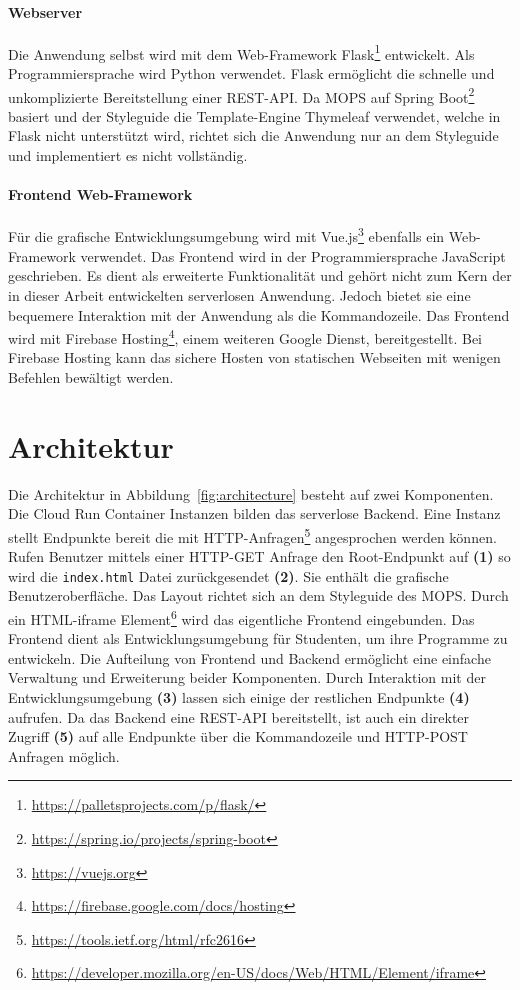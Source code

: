 \paragraph{Webserver} Die Anwendung selbst wird mit dem Web-Framework
Flask\footnote{\url{https://palletsprojects.com/p/flask/}}
entwickelt. Als Programmiersprache wird Python verwendet.
Flask ermöglicht die schnelle und unkomplizierte Bereitstellung einer REST-API.
Da MOPS auf Spring Boot\footnote{\url{https://spring.io/projects/spring-boot}} basiert und
der Styleguide die Template-Engine Thymeleaf verwendet, welche in Flask nicht unterstützt wird,
richtet sich die Anwendung nur an dem Styleguide und implementiert es nicht vollständig.

\paragraph{Frontend Web-Framework} Für die grafische Entwicklungsumgebung
wird mit Vue.js\footnote{\url{https://vuejs.org}} ebenfalls ein Web-Framework verwendet.
Das Frontend wird in der Programmiersprache JavaScript geschrieben. Es dient als
erweiterte Funktionalität und gehört nicht zum Kern der in dieser Arbeit entwickelten
serverlosen Anwendung. Jedoch bietet sie eine bequemere Interaktion mit der Anwendung als
die Kommandozeile. Das Frontend wird mit
Firebase Hosting\footnote{\url{https://firebase.google.com/docs/hosting}}, einem weiteren Google Dienst,
bereitgestellt. Bei Firebase Hosting kann das sichere Hosten von statischen Webseiten
mit wenigen Befehlen bewältigt werden.

\section{Architektur}
Die Architektur in Abbildung~\ref{fig:architecture} besteht auf zwei
Komponenten.
Die Cloud Run Container Instanzen bilden das serverlose Backend.
Eine Instanz stellt Endpunkte bereit die mit
HTTP-Anfragen\footnote{\url{https://tools.ietf.org/html/rfc2616}}
angesprochen werden können. Rufen Benutzer
mittels einer HTTP-GET Anfrage den
Root-Endpunkt auf \textbf{(1)} so wird
die \texttt{index.html} Datei zurückgesendet \textbf{(2)}.
Sie enthält die grafische Benutzeroberfläche. Das Layout richtet
sich an dem Styleguide des MOPS. Durch ein
HTML-iframe Element\footnote{\url{https://developer.mozilla.org/en-US/docs/Web/HTML/Element/iframe}}
wird das eigentliche Frontend eingebunden. Das Frontend dient als Entwicklungsumgebung für
Studenten, um ihre Programme zu entwickeln. Die Aufteilung von Frontend und Backend
ermöglicht eine einfache Verwaltung und Erweiterung beider Komponenten.
Durch Interaktion mit der Entwicklungsumgebung \textbf{(3)} lassen sich einige
der restlichen Endpunkte \textbf{(4)} aufrufen. 
Da das Backend eine REST-API bereitstellt, ist auch ein direkter Zugriff \textbf{(5)} auf alle 
Endpunkte über die Kommandozeile und HTTP-POST Anfragen möglich.

